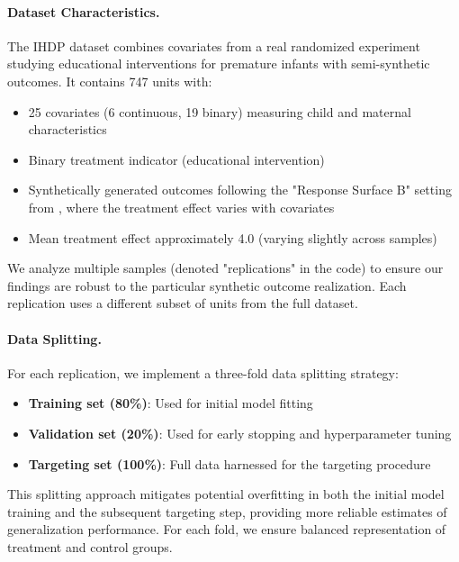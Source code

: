 \documentclass{article}
\theoremstyle{remark}
\begin{document}
\paragraph{Dataset Characteristics.}
The IHDP dataset combines covariates from a real randomized experiment studying educational interventions for premature infants with semi-synthetic outcomes. It contains 747 units with:
\begin{itemize}[leftmargin=15pt]
    \item 25 covariates (6 continuous, 19 binary) measuring child and maternal characteristics
    \item Binary treatment indicator (educational intervention)
    \item Synthetically generated outcomes following the "Response Surface B" setting from \cite{hill2011bayesian}, where the treatment effect varies with covariates
    \item Mean treatment effect approximately 4.0 (varying slightly across samples)
\end{itemize}
We analyze multiple samples (denoted "replications" in the code) to ensure our findings are robust to the particular synthetic outcome realization. Each replication uses a different subset of units from the full dataset.

\paragraph{Data Splitting.}
For each replication, we implement a three-fold data splitting strategy:
\begin{itemize}[leftmargin=15pt]
    \item \textbf{Training set (80\%)}: Used for initial model fitting
    \item \textbf{Validation set (20\%)}: Used for early stopping and hyperparameter tuning
    \item \textbf{Targeting set (100\%)}: Full data harnessed for the targeting procedure
\end{itemize}
This splitting approach mitigates potential overfitting in both the initial model training and the subsequent targeting step, providing more reliable estimates of generalization performance. For each fold, we ensure balanced representation of treatment and control groups.
\end{document}
